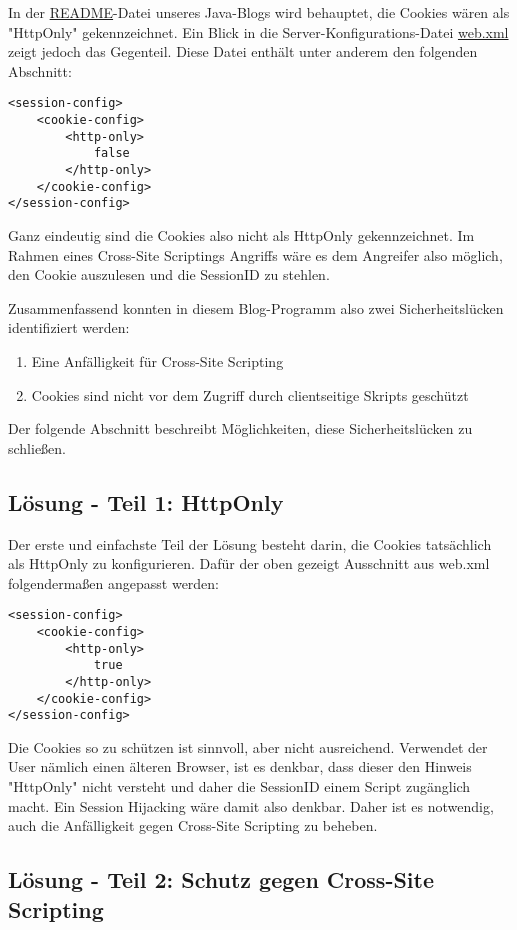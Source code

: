 In der \url{README}-Datei unseres Java-Blogs wird behauptet, die Cookies wären als "HttpOnly" gekennzeichnet. Ein Blick in die Server-Konfigurations-Datei \url{web.xml} zeigt jedoch das Gegenteil. Diese Datei enthält unter anderem den folgenden Abschnitt:

\begin{lstlisting}
<session-config>
	<cookie-config>
		<http-only>
			false
		</http-only>
	</cookie-config>
</session-config>
\end{lstlisting}

Ganz eindeutig sind die Cookies also nicht als HttpOnly gekennzeichnet. Im Rahmen eines Cross-Site Scriptings Angriffs wäre es dem Angreifer also möglich, den Cookie auszulesen und die SessionID zu stehlen.

Zusammenfassend konnten in diesem Blog-Programm also zwei Sicherheitslücken identifiziert werden:

\begin{enumerate}
\item Eine Anfälligkeit für Cross-Site Scripting
\item Cookies sind nicht vor dem Zugriff durch clientseitige Skripts geschützt
\end{enumerate}

Der folgende Abschnitt beschreibt Möglichkeiten, diese Sicherheitslücken zu schließen.

\subsection{Lösung - Teil 1: HttpOnly}

Der erste und einfachste Teil der Lösung besteht darin, die Cookies tatsächlich als HttpOnly zu konfigurieren. Dafür der oben gezeigt Ausschnitt aus web.xml folgendermaßen angepasst werden:

\begin{lstlisting}
<session-config>
	<cookie-config>
		<http-only>
			true
		</http-only>
	</cookie-config>
</session-config>
\end{lstlisting}

Die Cookies so zu schützen ist sinnvoll, aber nicht ausreichend. Verwendet der User nämlich einen älteren Browser, ist es denkbar, dass dieser den Hinweis "HttpOnly" nicht versteht und daher die SessionID einem Script zugänglich macht. Ein Session Hijacking wäre damit also denkbar. Daher ist es notwendig, auch die Anfälligkeit gegen Cross-Site Scripting zu beheben.

\subsection{Lösung - Teil 2: Schutz gegen Cross-Site Scripting}

